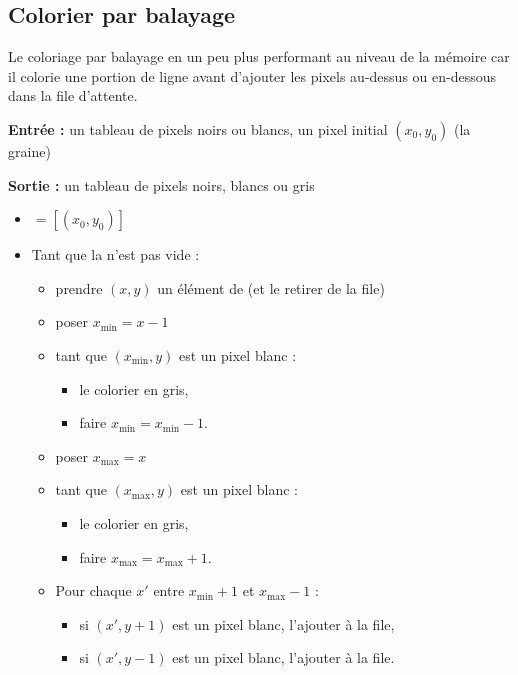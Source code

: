 \documentclass[11pt,class=report,crop=false]{standalone}
\begin{document}
\subsection{Colorier par balayage}


Le coloriage par balayage en un peu plus performant au niveau de la mémoire car il colorie une portion de ligne avant d'ajouter les pixels au-dessus ou en-dessous dans la file d'attente.

\begin{algorithme}

\textbf{Entrée :} un tableau de pixels noirs ou blancs, un pixel initial $(x_0,y_0)$ (la graine)

\textbf{Sortie :} un tableau de pixels noirs, blancs ou gris

\begin{itemize}
	\item {} $= [ (x_0,y_0)]$
	
	\item Tant que la  n'est pas vide :
	\begin{itemize}
		\item prendre $(x,y)$ un élément de  (et le retirer de la file)
	
		\item poser $x_{\text{min}} = x-1$
		\item tant que $(x_{\text{min}}, y)$ est un pixel blanc :
		\begin{itemize}
			\item le colorier en gris,
			\item faire $x_{\text{min}} = x_{\text{min}} - 1$.
        \end{itemize}
	
		\item poser $x_{\text{max}} = x$
		\item tant que $(x_{\text{max}}, y)$ est un pixel blanc :
		\begin{itemize}
			\item le colorier en gris,
			\item faire $x_{\text{max}} = x_{\text{max}} + 1$.
        \end{itemize}
	
		\item Pour chaque $x'$ entre $x_{\text{min}}+1$ et $x_{\text{max}}-1$ :
		\begin{itemize}
		    \item si $(x',y+1)$ est un pixel blanc, l'ajouter à la file,
			\item si $(x',y-1)$ est un pixel blanc, l'ajouter à la file.			
        \end{itemize}
		
	\end{itemize}
\end{itemize}
\end{algorithme}
	
\end{document}
